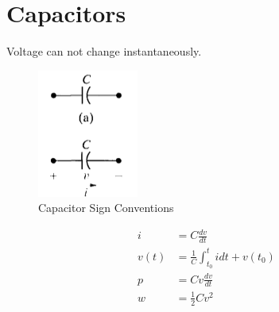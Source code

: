 \documentclass[a4paper,10pt]{report}
\begin{document}
\section{Capacitors}
Voltage can not change instantaneously.
\begin{figure}[htpb]
	\begin{centering}
	\begin{center}
	\includegraphics{./capacitor_sign_convention.png}
	\caption{Capacitor Sign Conventions}
	\label{fig:capacitor_sign_convention}
	\end{center}
	\par\end{centering}
\end{figure}

\begin{align*}
	i &= C\frac{dv}{dt} \\
	v(t) &= \frac{1}{C}\int_{t_0}^t i dt + v(t_0) \\
	p &= Cv\frac{dv}{dt} \\
	w &= \frac{1}{2}Cv^2
\end{align*}
\end{document}
